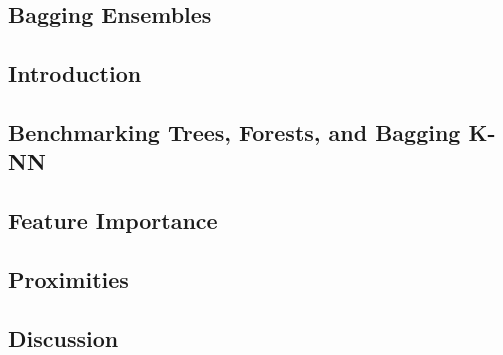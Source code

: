 

\subsection{Bagging Ensembles}


\subsection{Introduction}


\subsection{Benchmarking Trees, Forests, and Bagging K-NN}


\subsection{Feature Importance}


\subsection{Proximities}


\subsection{Discussion}


